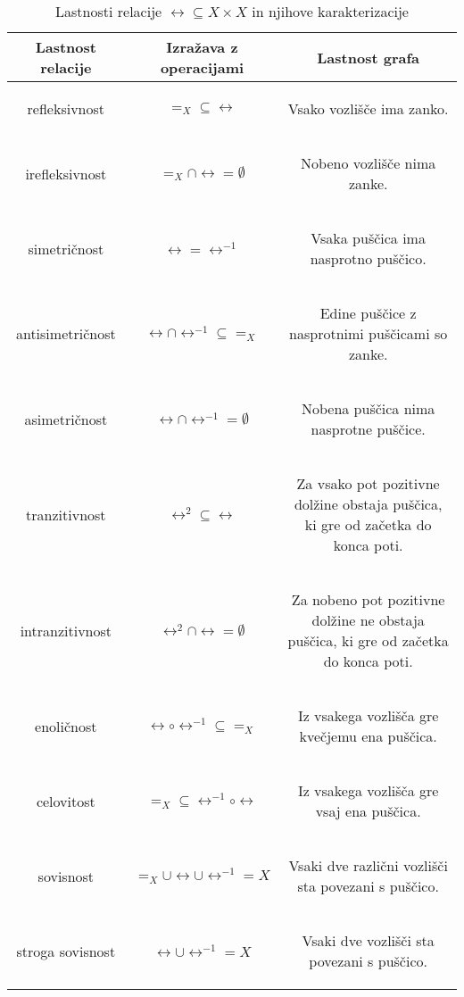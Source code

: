                 \begin{table}[!ht]
                        \centering
                        \newcommand{\opis}[1]{\begin{minipage}{0.45\textwidth}\begin{center}{#1}\end{center}\end{minipage}}
                        \def\arraystretch{3}
                        \begin{tabular}{|ccc|}
                                \hline
                                \textbf{Lastnost relacije} & \textbf{Izražava z operacijami} & \textbf{Lastnost grafa} \\
                                \hline
                                refleksivnost & $=_X \subseteq \rel$ & \opis{Vsako vozlišče ima zanko.} \\
                                irefleksivnost & $=_X \cap \rel = \emptyset$ & \opis{Nobeno vozlišče nima zanke.} \\
                                simetričnost & $\rel = \rel^{-1}$ & \opis{Vsaka puščica ima nasprotno puščico.} \\
                                antisimetričnost & $\rel \cap \rel^{-1} \subseteq =_X$ & \opis{Edine puščice z nasprotnimi puščicami so zanke.} \\
                                asimetričnost & $\rel \cap \rel^{-1} = \emptyset$ & \opis{Nobena puščica nima nasprotne puščice.} \\
                                tranzitivnost & $\rel^2 \subseteq \rel$ & \opis{Za vsako pot pozitivne dolžine obstaja puščica, ki gre od začetka do konca poti.} \\
                                intranzitivnost & $\rel^2 \cap \rel = \emptyset$ & \opis{Za nobeno pot pozitivne dolžine ne obstaja puščica, ki gre od začetka do konca poti.} \\
                                enoličnost & $\rel \circ \rel^{-1} \subseteq =_X$ & \opis{Iz vsakega vozlišča gre kvečjemu ena puščica.} \\
                                celovitost & $=_X \subseteq \rel^{-1} \circ \rel$ & \opis{Iz vsakega vozlišča gre vsaj ena puščica.} \\
                                sovisnost & $=_X \cup \rel \cup \rel^{-1} = X$ & \opis{Vsaki dve različni vozlišči sta povezani s puščico.} \\
                                stroga sovisnost & $\rel \cup \rel^{-1} = X$ & \opis{Vsaki dve vozlišči sta povezani s puščico.} \\
                                \hline
                        \end{tabular}
                        \caption{Lastnosti relacije $\rel \subseteq X \times X$ in njihove karakterizacije}\label{tabela:lastnosti-relacije}
                \end{table}

